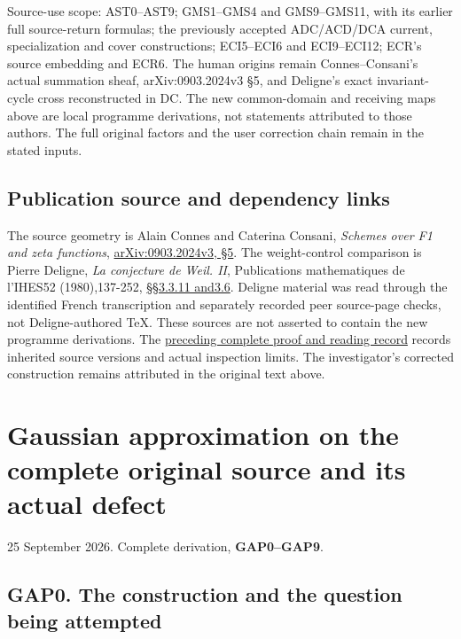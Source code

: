Source-use scope: AST0--AST9; GMS1--GMS4 and GMS9--GMS11, with its
earlier full source-return formulas; the previously accepted ADC/ACD/DCA
current, specialization and cover constructions; ECI5--ECI6 and
ECI9--ECI12; ECR's source embedding and ECR6. The human origins remain
Connes--Consani's actual summation sheaf, arXiv:0903.2024v3 §5, and
Deligne's exact invariant-cycle cross reconstructed in DC. The new
common-domain and receiving maps above are local programme derivations,
not statements attributed to those authors. The full original factors
and the user correction chain remain in the stated inputs.

\section{Publication source and dependency
links}\label{publication-source-and-dependency-links-6}

The source geometry is Alain Connes and Caterina Consani, \emph{Schemes
over F1 and zeta functions},
\href{https://arxiv.org/abs/0903.2024v3}{arXiv:0903.2024v3, §5}. The
weight-control comparison is Pierre Deligne, \emph{La conjecture de
Weil. II}, Publications mathematiques de l'IHES52 (1980),137-252,
\href{https://www.numdam.org/item/PMIHES_1980__52__137_0/}{§§3.3.11
and3.6}. Deligne material was read through the identified French
transcription and separately recorded peer source-page checks, not
Deligne-authored TeX. These sources are not asserted to contain the new
programme derivations. The
\href{https://github.com/KokunoYumeto/zeta-function-research-reader/blob/36a82ecca98addb8a98b48204e349737856c7223/workbenches/splitzero-tandem/continuations/20260924-cohomology-weight-and-character-lifts/BUILD_AND_REVIEW.md}{preceding
complete proof and reading record} records inherited source versions and
actual inspection limits. The investigator's corrected construction
remains attributed in the original text above.

\chapter{Gaussian approximation on the complete original source and its
actual
defect}\label{gaussian-approximation-on-the-complete-original-source-and-its-actual-defect}

25 September 2026. Complete derivation, \textbf{GAP0--GAP9}.

\section{GAP0. The construction and the question being
attempted}\label{gap0.-the-construction-and-the-question-being-attempted}

